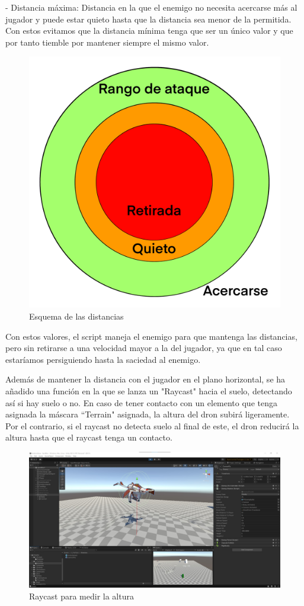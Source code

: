 \documentclass[12pt,spanish]{article}
\begin{document}
    - Distancia máxima: Distancia en la que el enemigo no necesita acercarse más al jugador y puede estar quieto hasta que la distancia sea menor de la permitida. Con estos evitamos que la distancia mínima tenga que ser un único valor y que por tanto tiemble por mantener siempre el mismo valor.

\begin{figure}[h!]
 \centering
 \includegraphics[width = 0.25\linewidth]{enemies/CannonFly/Rangos.png}
 \caption{Esquema de las distancias}
 \label{fig:t2}
\end{figure}

    Con estos valores, el script maneja el enemigo para que mantenga las distancias, pero sin retirarse a una velocidad mayor a la del jugador, ya que en tal caso estaríamos persiguiendo hasta la saciedad al enemigo.\\

\newpage

    Además de mantener la distancia con el jugador en el plano horizontal, se ha añadido una función en la que se lanza un "Raycast" hacia el suelo, detectando así si hay suelo o no. En caso de tener contacto con un elemento que tenga asignada la máscara ``Terrain" asignada, la altura del dron subirá ligeramente. Por el contrario, si el raycast no detecta suelo al final de este, el dron reducirá la altura hasta que el raycast tenga un contacto.

\begin{figure}[h!]
 \centering
 \includegraphics[width = 0.7\linewidth]{enemies/CannonFly/CannonFly_Raycast.jpg}
 \caption{Raycast para medir la altura}
 \label{fig:t2}
\end{figure}
\end{document}
